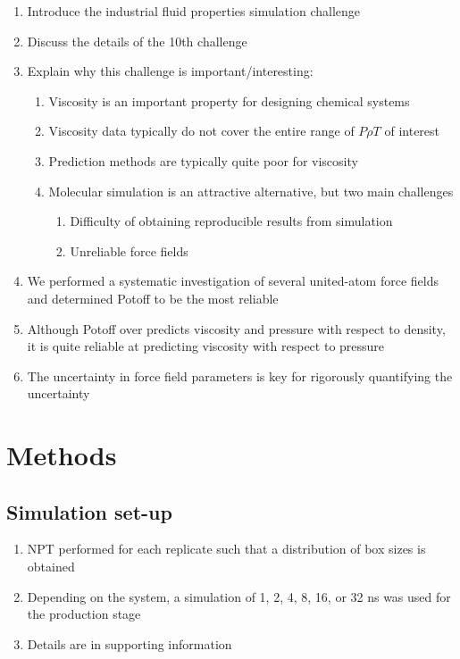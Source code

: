 \documentclass[11pt,a4paper]{article}
\begin{document}
\begin{enumerate}
	\item Introduce the industrial fluid properties simulation challenge
	\item Discuss the details of the 10th challenge
	\item Explain why this challenge is important/interesting:
	\begin{enumerate}
		\item Viscosity is an important property for designing chemical systems
		\item Viscosity data typically do not cover the entire range of $P \rho T$ of interest
		\item Prediction methods are typically quite poor for viscosity
		\item Molecular simulation is an attractive alternative, but two main challenges
		\begin{enumerate}
			\item Difficulty of obtaining reproducible results from simulation
			\item Unreliable force fields
		\end{enumerate}
	\end{enumerate}
	\item We performed a systematic investigation of several united-atom force fields and determined Potoff to be the most reliable
	\item Although Potoff over predicts viscosity and pressure with respect to density, it is quite reliable at predicting viscosity with respect to pressure
	\item The uncertainty in force field parameters is key for rigorously quantifying the uncertainty
\end{enumerate}

\section{Methods}

\subsection{Simulation set-up}

\begin{enumerate}
	\item NPT performed for each replicate such that a distribution of box sizes is obtained
	\item Depending on the system, a simulation of 1, 2, 4, 8, 16, or 32 ns was used for the production stage
	\item Details are in supporting information
\end{enumerate}
\end{document}
